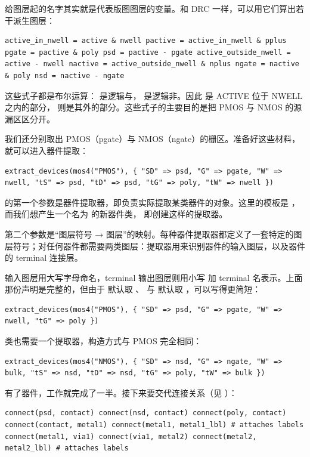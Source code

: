 给图层起的名字其实就是代表版图图层的变量。和 DRC 一样，可以用它们算出若干派生图层：

\begin{lstlisting}
active_in_nwell = active & nwell pactive = active_in_nwell & pplus pgate = pactive & poly psd = pactive - pgate active_outside_nwell = active - nwell nactive = active_outside_nwell & nplus ngate = nactive & poly nsd = nactive - ngate
\end{lstlisting}

这些式子都是布尔运算：\ui{\&} 是逻辑与，\ui{-} 是逻辑非。因此  是 ACTIVE 位于 NWELL 之内的部分， 则是其外的部分。这些式子的主要目的是把 PMOS 与 NMOS 的源漏区区分开。

我们还分别取出 PMOS（pgate）与 NMOS（ngate）的栅区。准备好这些材料，就可以进入器件提取：

\begin{lstlisting}
extract_devices(mos4("PMOS"), { "SD" => psd, "G" => pgate, "W" => nwell, "tS" => psd, "tD" => psd, "tG" => poly, "tW" => nwell })
\end{lstlisting}

 的第一个参数是器件提取器，即负责实际提取某类器件的对象。这里的模板是 ，而我们想产生一个名为  的新器件类， 即创建这样的提取器。

第二个参数是“图层符号 → 图层”的映射。每种器件提取器都定义了一套特定的图层符号；对任何器件都需要两类图层：提取器用来识别器件的输入图层，以及器件的 terminal 连接层。

输入图层用大写字母命名，terminal 输出图层则用小写  加 terminal 名表示。上面那份声明是完整的，但由于  默认取 、 与  默认取 ，可以写得更简短：

\begin{lstlisting}
extract_devices(mos4("PMOS"), { "SD" => psd, "G" => pgate, "W" => nwell, "tG" => poly })
\end{lstlisting}

 类也需要一个提取器，构造方式与 PMOS 完全相同：

\begin{lstlisting}
extract_devices(mos4("NMOS"), { "SD" => nsd, "G" => ngate, "W" => bulk, "tS" => nsd, "tD" => nsd, "tG" => poly, "tW" => bulk })
\end{lstlisting}

有了器件，工作就完成了一半。接下来要交代连接关系（见 ）：

\begin{lstlisting}
connect(psd, contact) connect(nsd, contact) connect(poly, contact) connect(contact, metal1) connect(metal1, metal1_lbl) # attaches labels connect(metal1, via1) connect(via1, metal2) connect(metal2, metal2_lbl) # attaches labels
\end{lstlisting}


